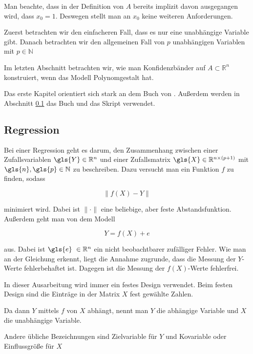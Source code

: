 \documentclass[12pt,a4paper]{article}
\theoremstyle{definition}
\theoremstyle{definition}
\theoremstyle{definition}
\theoremstyle{definition}
\begin{document}
Man beachte, dass in der Definition von $A$ bereits implizit davon ausgegangen wird, dass $x_0=1$. Deswegen stellt man an $x_0$ keine weiteren Anforderungen.

Zuerst betrachten wir den einfacheren Fall, dass es nur eine unabhängige Variable gibt. Danach betrachten wir den allgemeinen Fall von $p$ unabhängigen Variablen mit $p \in \mathbb{N} $

Im letzten Abschnitt betrachten wir, wie man Konfidenzbänder auf $A \subset \mathbb{R}^n$ konstruiert, wenn das Modell Polynomgestalt hat.

Das erste Kapitel orientiert sich stark an dem Buch von \cite{Liu64}. Außerdem werden in Abschnitt \ref{Regression} das Buch \cite{Georgii09} und das Skript \cite{Kriv15} verwendet.


\subsection{Regression}
\label{Regression}
Bei einer Regression geht es darum, den Zusammenhang zwischen einer Zufallsvariablen $\gls{Y} \in \mathbb{R}^n$ und einer Zufallsmatrix $\gls{X} \in \mathbb{R}^{n \times (p+1)}$ mit $\gls{n}, \gls{p} \in \mathbb{N}$ zu beschreiben. Dazu versucht man ein Funktion $f$ zu finden, sodass

\begin{equation*}
\| f(X) - Y \|
\end{equation*}

minimiert wird. Dabei ist $ \| \cdot \|$ eine beliebige, aber feste Abstandsfunktion. Außerdem geht man von dem Modell

\begin{equation*}
Y = f(X) + e
\end{equation*}

aus. Dabei ist $\gls{e} ~ \in \mathbb{R}^n$ ein nicht beobachtbarer zufälliger Fehler. Wie man an der Gleichung erkennt, liegt die Annahme zugrunde, dass die Messung der $Y$-Werte fehlerbehaftet ist.
Dagegen ist die Messung der $f(X)$-Werte fehlerfrei.

In dieser Ausarbeitung wird immer ein festes Design verwendet. Beim festen Design sind die Einträge in der Matrix $X$ fest gewählte Zahlen.

Da dann $Y$ mittels $f$ von $X$ abhängt, nennt man $Y$ die abhängige Variable und $X$ die unabhängige Variable. 

Andere übliche Bezeichnungen sind Zielvariable für $Y$ und Kovariable oder Einflussgröße für $X$
\end{document}
